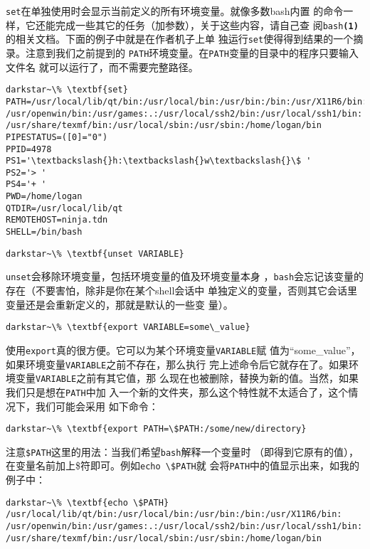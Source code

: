 \texttt{set}在单独使用时会显示当前定义的所有环境变量。就像多数bash内置
的命令一样，它还能完成一些其它的任务（加参数），关于这些内容，请自己查
阅\texttt{bash\textbf{(1)}}的相关文档。下面的例子中就是在作者机子上单
独运行\texttt{set}使得得到结果的一个摘录。注意到我们之前提到的
\texttt{PATH}环境变量。在\texttt{PATH}变量的目录中的程序只要输入文件名
就可以运行了，而不需要完整路径。

\begin{Verbatim}[frame=single, commandchars=\\\{\}]
darkstar~\% \textbf{set}
PATH=/usr/local/lib/qt/bin:/usr/local/bin:/usr/bin:/bin:/usr/X11R6/bin:
/usr/openwin/bin:/usr/games:.:/usr/local/ssh2/bin:/usr/local/ssh1/bin:
/usr/share/texmf/bin:/usr/local/sbin:/usr/sbin:/home/logan/bin
PIPESTATUS=([0]="0")
PPID=4978
PS1='\textbackslash{}h:\textbackslash{}w\textbackslash{}\$ '
PS2='> '
PS4='+ '
PWD=/home/logan
QTDIR=/usr/local/lib/qt
REMOTEHOST=ninja.tdn
SHELL=/bin/bash
\end{Verbatim}

\begin{Verbatim}[frame=single, commandchars=\\\{\}]
darkstar~\% \textbf{unset VARIABLE}
\end{Verbatim}

\texttt{unset}会移除环境变量，包括环境变量的值及环境变量本身
，\texttt{bash}会忘记该变量的存在（不要害怕，除非是你在某个shell会话中
单独定义的变量，否则其它会话里变量还是会重新定义的，那就是默认的一些变
量）。

\begin{Verbatim}[frame=single, commandchars=\\\{\}]
darkstar~\% \textbf{export VARIABLE=some\_value}
\end{Verbatim}

使用\texttt{export}真的很方便。它可以为某个环境变量\texttt{VARIABLE}赋
值为``some\_value''，如果环境变量\texttt{VARIABLE}之前不存在，那么执行
完上述命令后它就存在了。如果环境变量\texttt{VARIABLE}之前有其它值，那
么现在也被删除，替换为新的值。当然，如果我们只是想在\texttt{PATH}中加
入一个新的文件夹，那么这个特性就不太适合了，这个情况下，我们可能会采用
如下命令：
\begin{Verbatim}[frame=single, commandchars=\\\{\}]
darkstar~\% \textbf{export PATH=\$PATH:/some/new/directory}
\end{Verbatim}

注意\texttt{\$PATH}这里的用法：当我们希望\texttt{bash}解释一个变量时
（即得到它原有的值），在变量名前加上\$符即可。例如\verb|echo \$PATH|就
会将\texttt{PATH}中的值显示出来，如我的例子中：
\begin{Verbatim}[frame=single, commandchars=\\\{\}]
darkstar~\% \textbf{echo \$PATH}
/usr/local/lib/qt/bin:/usr/local/bin:/usr/bin:/bin:/usr/X11R6/bin:
/usr/openwin/bin:/usr/games:.:/usr/local/ssh2/bin:/usr/local/ssh1/bin:
/usr/share/texmf/bin:/usr/local/sbin:/usr/sbin:/home/logan/bin
\end{Verbatim}


